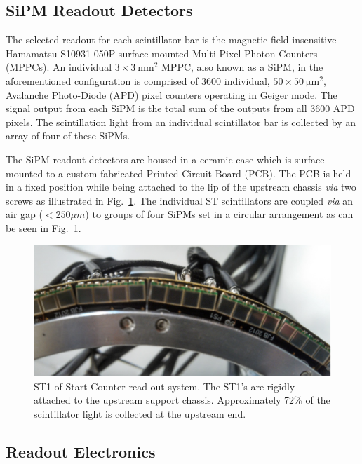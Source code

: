 \subsection{SiPM Readout Detectors} \label{sec:design_sipms}

The selected readout for each scintillator bar is the magnetic field insensitive Hamamatsu S10931-050P surface mounted Multi-Pixel Photon Counters (MPPCs)\cite{hamamatsu}.  An individual $\mathrm{3 \times 3\ mm^2}$ MPPC, also known as a SiPM, in the aforementioned configuration is comprised of 3600 individual, $\mathrm{50 \times 50\ \mu m^2}$, Avalanche Photo-Diode (APD) pixel counters operating in Geiger mode. The signal output from each SiPM is the total sum of the outputs from all 3600 APD pixels\cite{sipm_spec}.  The scintillation light from an individual scintillator bar is collected by an array of four of these SiPMs.

The SiPM readout detectors are housed in a ceramic case which is surface mounted to a custom fabricated Printed Circuit Board (PCB).  The PCB is held in a fixed position while being attached to the lip of the upstream chassis \emph{via} two screws as illustrated in Fig.~\ref{fig:st1_mounted}.  The individual ST scintillators are coupled \emph{via} an air gap ($< 250 \mu m$) to groups of four SiPMs set in a circular arrangement as can be seen in Fig.~\ref{fig:st1_mounted}.
\begin{figure}[!htb]
	\centering
	\includegraphics[width=1.0\columnwidth]{design/figs/st1_mounted}
	\caption{ST1 of Start Counter read out system. The ST1's are rigidly attached to the upstream support chassis.  Approximately 72\% of the scintillator light is collected at the upstream end.}
	\label{fig:st1_mounted}
\end{figure}

\subsection{Readout Electronics} \label{sec:design_electronics}

